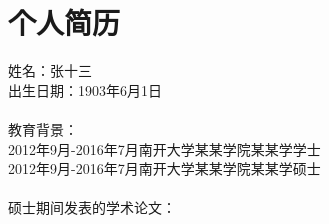 

\chapter*{个人简历}

\noindent 姓名：张十三\\
出生日期：1903年6月1日\\
\\
教育背景：\\  
2012年9月-2016年7月\quad 南开大学\quad 某某学院\quad\quad\quad\quad 某某学\quad\quad 学士 \\ 
2012年9月-2016年7月\quad 南开大学\quad 某某学院\quad\quad\quad\quad 某某学\quad\quad 硕士 \\
\\
硕士期间发表的学术论文：\\

